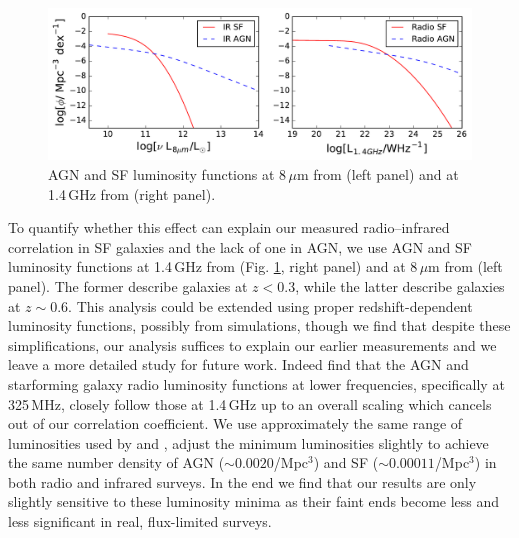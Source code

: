 \documentclass{emulateapj}
\begin{document}
\begin{figure}[h]
\centering
\includegraphics[width=6in]{images/sim_rad_ir_luminosity_functions.pdf}
\caption{AGN and SF luminosity functions at 8\,$\mu$m from \citet{fu10} (left panel) and at 1.4\,GHz from \citet{mauch07} (right panel).}
\label{fig:luminosityfunctions}
\end{figure}

To quantify whether this effect can explain our measured radio--infrared correlation in SF galaxies and the lack of one in AGN, we use AGN and SF luminosity functions at 1.4\,GHz from \citet{mauch07} (Fig. \ref{fig:luminosityfunctions}, right panel) and at 8\,$\mu$m from \citet{fu10} (left panel). The former describe galaxies at $z<0.3$, while the latter describe galaxies at $z\sim0.6$. This analysis could be extended using proper redshift-dependent luminosity functions, possibly from simulations, though we find that despite these simplifications, our analysis suffices to explain our earlier measurements and we leave a more detailed study for future work. Indeed \citet{prescott16} find that the AGN and starforming galaxy radio luminosity functions at lower frequencies, specifically at 325\,MHz, closely follow those at 1.4\,GHz up to an overall scaling which cancels out of our correlation coefficient. We use approximately the same range of luminosities used by \citet{mauch07} and \citet{fu10}, adjust the minimum luminosities slightly to achieve the same number density of AGN ($\sim0.0020$/Mpc$^3$) and SF ($\sim0.00011$/Mpc$^3$) in both radio and infrared surveys. In the end we find that our results are only slightly sensitive to these luminosity minima as their faint ends become less and less significant in real, flux-limited surveys. 
\end{document}
